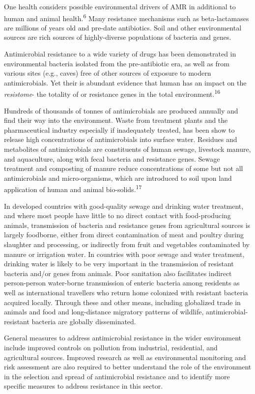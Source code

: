 \documentclass[
]{book}
\begin{document}
One health considers possible environmental drivers of AMR in additional to human and animal health.\textsuperscript{6} Many resistance mechanisms such as beta-lactamases are millions of years old and pre-date antibiotics. Soil and other environmental sources are rich sources of highly-diverse populations of bacteria and genes.

Antimicrobial resistance to a wide variety of drugs has been demonstrated in environmental bacteria isolated from the pre-antibiotic era, as well as from various sites (e.g., caves) free of other sources of exposure to modern antimicrobials. Yet their is abundant evidence that human has an impact on the \emph{resistome}- the totality of or resistance genes in the total environment.\textsuperscript{16}

Hundreds of thousands of tonnes of antimicrobials are produced annually and find their way into the environment. Waste from treatment plants and the pharmaceutical industry especially if inadequately treated, has been show to release high concentrations of antimicrobials into surface water. Residues and metabolites of antimicrobials are constituents of human sewage, livestock manure, and aquaculture, along with fecal bacteria and resistance genes. Sewage treatment and composting of manure reduce concentrations of some but not all antimicrobials and micro-organisms, which are introduced to soil upon land application of human and animal bio-solids.\textsuperscript{17}

In developed countries with good-quality sewage and drinking water treatment, and where most people have little to no direct contact with food-producing animals, transmission of bacteria and resistance genes from agricultural sources is largely foodborne, either from direct contamination of meat and poultry during slaughter and processing, or indirectly from fruit and vegetables contaminated by manure or irrigation water. In countries with poor sewage and water treatment, drinking water is likely to be very important in the transmission of resistant bacteria and/or genes from animals. Poor sanitation also facilitates indirect person-person water-borne transmission of enteric bacteria among residents as well as international travellers who return home colonized with resistant bacteria acquired locally. Through these and other means, including globalized trade in animals and food and long-distance migratory patterns of wildlife, antimicrobial-resistant bacteria are globally disseminated.

General measures to address antimicrobial resistance in the wider environment include improved controls on pollution from industrial, residential, and agricultural sources. Improved research as well as environmental monitoring and risk assessment are also required to better understand the role of the environment in the selection and spread of antimicrobial resistance and to identify more specific measures to address resistance in this sector.
\end{document}

